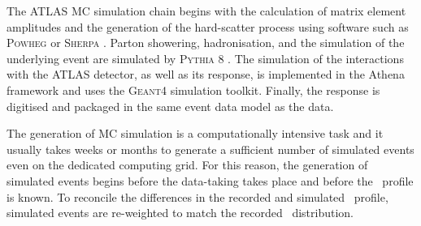 The ATLAS MC simulation chain begins with the calculation of matrix element 
amplitudes and the generation of the hard-scatter process using
software such as \textsc{Powheg} \cite{powheg, Frixione_2007, Alioli_2010}
or \textsc{Sherpa} \cite{sherpa1, sherpa2}. Parton showering, hadronisation,
and the simulation of the underlying event are simulated by
\textsc{Pythia} 8 \cite{Sj_strand_2008}. The simulation of the
interactions with the ATLAS detector, as well as its response, is
implemented in the Athena framework \cite{Aad:2010ah, Duckeck:2005rb} and uses the
\textsc{Geant4} \cite{Agostinelli:2002hh, 1610988, ALLISON2016186}
simulation toolkit. Finally, the response is digitised
and packaged in the same event data model \cite{Buckley_2015} as the
data.

The generation of MC simulation is a computationally intensive task
and it usually takes weeks or months to generate a sufficient number
of simulated events even on the dedicated computing grid. For this
reason, the generation of simulated events begins before the data-taking
takes place and before the \pileup~profile is known. To reconcile the
differences in the recorded and simulated \pileup~profile, simulated
events are re-weighted to match the recorded \pileup~distribution.







